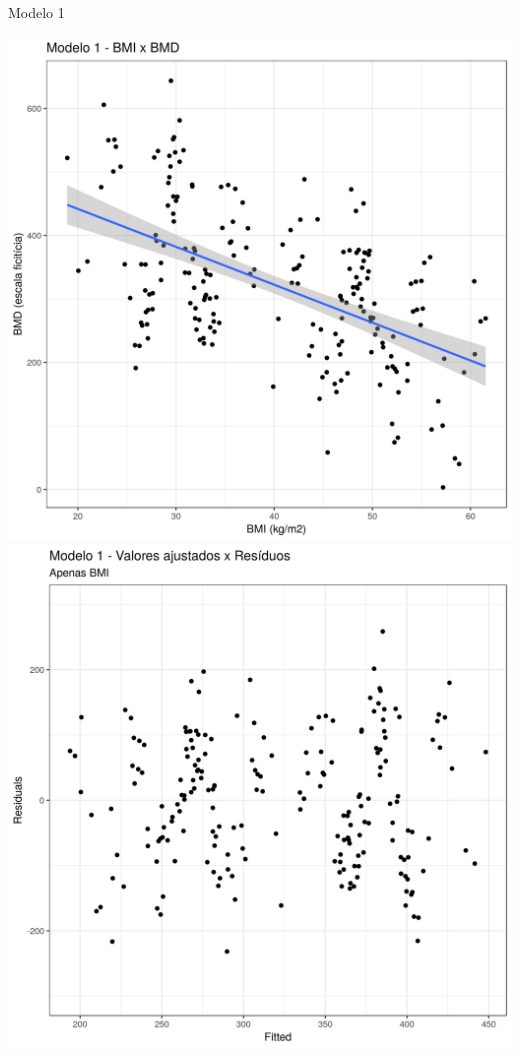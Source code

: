 \documentclass{beamer}
\begin{document}
\begin{frame}{\small Modelo 1}
  \begin{center}
    \includegraphics[height=.6\textheight]{Cap31-32/pratica-rlm1}
    \includegraphics[height=.6\textheight]{Cap31-32/pratica-rlm1-resid}
\end{center}
\end{frame}
\end{document}
